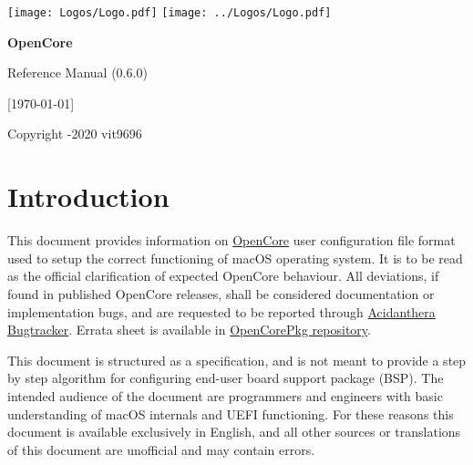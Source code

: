 \documentclass[]{article}
\begin{document}
\begin{titlepage}
   \begin{center}
       \vspace*{2.0in}

       \Huge

         {\texttt{[image: Logos/Logo.pdf]}}
         {\texttt{[image: ../Logos/Logo.pdf]}}

       \sffamily

       \textbf{OpenCore}

       \vspace{0.2in}

       Reference Manual (0.6.0)

       \vspace{0.2in}

        {[}\today{]}

       \normalsize

       \vfill

       \rmfamily

       Copyright -2020 vit9696

   \end{center}
\end{titlepage}

\tableofcontents

\section{Introduction}\label{introduction}

This document provides information on
\href{https://github.com/acidanthera/OpenCorePkg}{OpenCore} user
configuration file format used to setup the correct functioning of macOS
operating system. It is to be read as the official clarification of expected
OpenCore behaviour. All deviations, if found in published OpenCore releases,
shall be considered documentation or implementation bugs, and are requested to be
reported through \href{https://github.com/acidanthera/bugtracker}{Acidanthera Bugtracker}.
Errata sheet is available in
\href{https://github.com/acidanthera/OpenCorePkg/blob/master/Docs/Errata/Errata.pdf}{OpenCorePkg repository}.

This document is structured as a specification, and is not meant to provide a step by
step algorithm for configuring end-user board support package (BSP). The intended audience
of the document are programmers and engineers with basic understanding of macOS internals
and UEFI functioning. For these reasons this document is available exclusively in English,
and all other sources or translations of this document are unofficial and may
contain errors.
\end{document}

